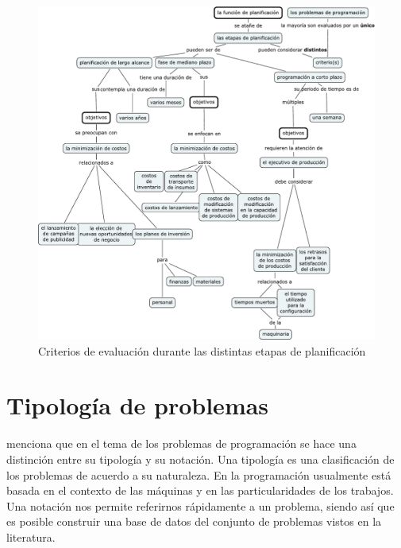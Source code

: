 \documentclass[spanish,draft,12pt,headsepline,footsepline,paper=letter]{scrreprt}
\begin{document}
\begin{figure}[hbtp]
\centering
\includegraphics[height=.90\textheight]{media/criterios_evaluacion.pdf}
\caption[Criterios de evaluación]{Criterios de evaluación durante las distintas etapas de planificación}
\label{fig:criterios_evaluacion}
\end{figure}

\section{Tipología de problemas}

\citet[p.~14]{TKindt2002} menciona que en el tema de los problemas de programación se hace una distinción entre su tipología y su notación. Una tipología es una clasificación de los problemas de acuerdo a su naturaleza. En la programación usualmente está basada en el contexto de las máquinas y en las particularidades de los trabajos. Una notación nos permite referirnos rápidamente a un problema, siendo así que es posible construir una base de datos del conjunto de problemas vistos en la literatura.
\end{document}
